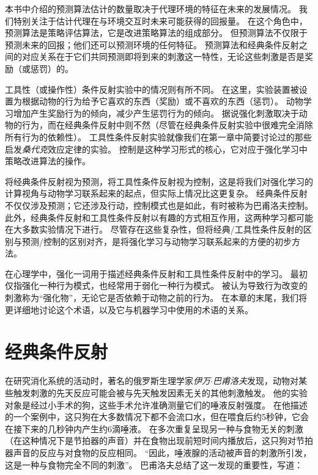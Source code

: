 本书中介绍的预测算法估计的数量取决于代理环境的特征在未来的发展情况。
我们特别关注于估计代理在与环境交互时未来可能获得的回报量。
在这个角色中，预测算法是策略评估算法，它是改进策略算法的组成部分。
但预测算法不仅限于预测未来的回报；他们还可以预测环境的任何特征\cite{modayil2014prediction}。
预测算法和经典条件反射之间的对应关系在于它们共同预测即将到来的刺激这一特性，无论这些刺激是否是奖励（或惩罚）的。


工具性（或操作性）条件反射实验中的情况则有所不同。
在这里，实验装置被设置为根据动物的行为给予它喜欢的东西（奖励）或不喜欢的东西（惩罚）。
动物学习增加产生奖励行为的倾向，减少产生惩罚行为的倾向。
据说强化刺激取决于动物的行为，而在经典条件反射中则不然（尽管在经典条件反射实验中很难完全消除所有行为的依赖性）。
工具性条件反射实验就像我们在第一章中简要讨论过的那些启发\textit{桑代克}效应定律的实验。
控制是这种学习形式的核心，它对应于强化学习中策略改进算法的操作。


将经典条件反射视为预测，将工具性条件反射视为控制，这是将我们对强化学习的计算视角与动物学习联系起来的起点，但实际上情况比这更复杂。
经典条件反射不仅仅涉及预测；它还涉及行动，控制模式也是如此，有时被称为巴甫洛夫控制。
此外，经典条件反射和工具性条件反射以有趣的方式相互作用，这两种学习都可能在大多数实验情况下进行。
尽管存在这些复杂性，但将经典/工具性条件反射的区别与预测/控制的区别对齐，是将强化学习与动物学习联系起来的方便的初步方法。


在心理学中，强化一词用于描述经典条件反射和工具性条件反射中的学习。
最初仅指强化一种行为模式，也经常用于弱化一种行为模式。
被认为导致行为改变的刺激称为“强化物”，无论它是否依赖于动物之前的行为。
在本章的末尾，我们将更详细地讨论这个术语，以及它与机器学习中使用的术语的关系。


\section{经典条件反射} \label{sec:classical_conditioning}

在研究消化系统的活动时，著名的俄罗斯生理学家\textit{伊万$\cdot$巴甫洛夫}发现，动物对某些触发刺激的先天反应可能会被与先天触发因素无关的其他刺激触发。
他的实验对象是经过小手术的狗，这些手术允许准确测量它们的唾液反射强度。
在他描述的一个案例中，这只狗在大多数情况下都不会流口水，但在喂食后约5秒钟，它会在接下来的几秒钟内产生约6滴唾液。
在多次重复呈现另一种与食物无关的刺激（在这种情况下是节拍器的声音）并在食物出现前短时间内播放后，这只狗对节拍器声音的反应与对食物的反应相同。
“因此，唾液腺的活动被声音的刺激所引发，这是一种与食物完全不同的刺激”。
巴甫洛夫总结了这一发现的重要性，写道：


